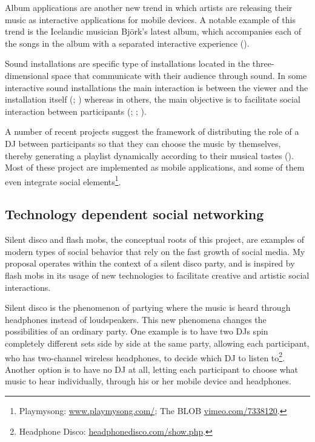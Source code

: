 \documentclass[a4paper,11pt]{article}
\begin{document}
Album applications are another new trend in which artists are releasing their music as interactive applications for mobile devices.
A notable example of this trend is the Icelandic musician Bj\"{o}rk's latest album, which accompanies each of the songs in the album with a separated interactive experience (\cite{stimulant13}).

Sound installations are specific type of installations located in the three-dimensional space that communicate with their audience through sound.
In some interactive sound installations the main interaction is between the viewer and the installation itself (\cite{web:visnjic}; \cite{web:cardiff01}) whereas in others, the main objective is to facilitate social interaction between participants (\cite{eng03}; \cite{web:kirn12}; \cite{web:murray-browne13}).

A number of recent projects suggest the framework of distributing the role of a DJ between participants so that they can choose the music by themselves, thereby generating a playlist dynamically according to their musical tastes (\cite{web:shaw}).
Most of these project are implemented as mobile applications, and some of them even integrate social elements\footnote{Playmysong: \href{http://www.playmysong.com/}{www.playmysong.com/}; The BLOB \href{http://vimeo.com/7338120}{vimeo.com/7338120}.}.

\subsection{Technology dependent social networking}

Silent disco and flash mobs, the conceptual roots of this project, are examples of modern types of social behavior that rely on the fast growth of social media.
My proposal operates within the context of a silent disco party, and is inspired by flash mobs in its usage of new technologies to facilitate creative and artistic social interactions.

Silent disco is the phenomenon of partying where the music is heard through headphones instead of loudspeakers.
This new phenomena changes the possibilities of an ordinary party.
One example is to have two DJs spin completely different sets side by side at the same party, allowing each participant, who has two-channel wireless headphones, to decide which DJ to listen to\footnote{Headphone Disco: \href{http://headphonedisco.com/show.php}{headphonedisco.com/show.php}.}.
Another option is to have no DJ at all, letting each participant to choose what music to hear individually, through his or her mobile device and headphones.
\end{document}
